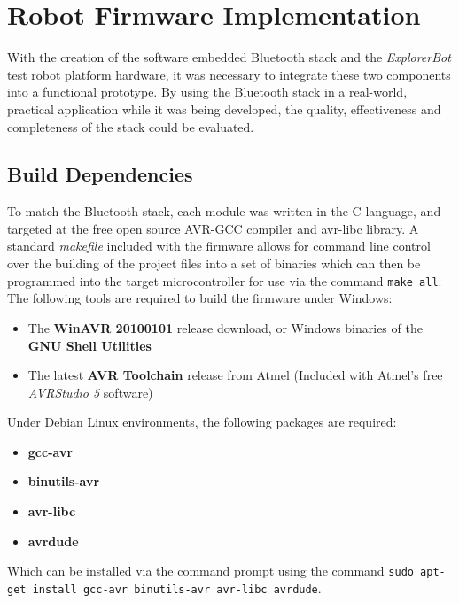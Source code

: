 \chapter{Robot Firmware Implementation}
\label{chp:robotfwimp}

With the creation of the software embedded Bluetooth stack and the \textit{ExplorerBot} test robot platform hardware, it was necessary to integrate these two components into a functional prototype. By using the Bluetooth stack in a real-world, practical application while it was being developed, the quality, effectiveness and completeness of the stack could be evaluated.

\section{Build Dependencies}

To match the Bluetooth stack, each module was written in the C language, and targeted at the free open source AVR-GCC compiler and avr-libc library. A standard \textit{makefile} included with the firmware allows for command line control over the building of the project files into a set of binaries which can then be programmed into the target microcontroller for use via the command \texttt{make all}. The following tools are required to build the firmware under Windows:

\begin{itemize}
	\item The \textbf{WinAVR 20100101} release download, or Windows binaries of the \textbf{GNU Shell Utilities}
	\item The latest \textbf{AVR Toolchain} release from Atmel (Included with Atmel's free \textit{AVRStudio 5} software)
\end{itemize}

Under Debian Linux environments, the following packages are required:

\begin{itemize}
	\item \textbf{gcc-avr} 
	\item \textbf{binutils-avr}
	\item \textbf{avr-libc}
	\item \textbf{avrdude}
\end{itemize}

Which can be installed via the command prompt using the command \texttt{sudo apt-get install gcc-avr binutils-avr avr-libc avrdude}.


